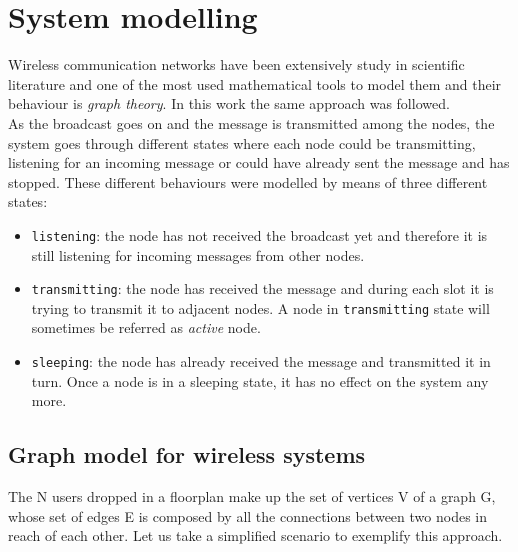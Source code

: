 \chapter{System modelling}\label{modelling}
Wireless communication networks have been extensively study in scientific literature and one of the most used mathematical tools to model them and their behaviour is \textit{graph theory}.
In this work the same approach was followed.\\
As the broadcast goes on and the message is transmitted among the nodes, the system goes through different states where each node could be transmitting, listening for an incoming message or could have already sent the message and has stopped.
These different behaviours were modelled by means of three different states:
\begin{itemize}
	\item
	\texttt{listening}: the node has not received the broadcast yet and therefore it is still listening for incoming messages from other nodes.
	\item
	\texttt{transmitting}: the node has received the message and during each slot it is trying to transmit it to adjacent nodes. A node in \texttt{transmitting} state will sometimes be referred as \textit{active} node.
	\item
	\texttt{sleeping}: the node has already received the message and transmitted it in turn. Once a node is in a sleeping state, it has no effect on the system any more.
\end{itemize}


\section{Graph model for wireless systems}

The N users dropped in a floorplan make up the set of vertices V of a graph G, whose set of edges E is composed by all the connections between two nodes in reach of each other. Let us take a simplified scenario to exemplify this approach.

